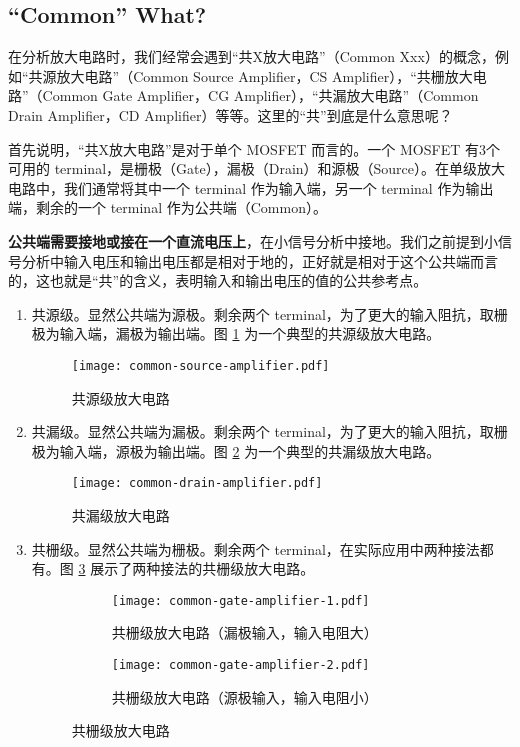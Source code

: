 \subsection{``Common'' What?}
在分析放大电路时，我们经常会遇到“共X放大电路”（Common Xxx）的概念，例如“共源放大电路”（Common Source Amplifier，CS Amplifier），“共栅放大电路”（Common Gate Amplifier，CG Amplifier），“共漏放大电路”（Common Drain Amplifier，CD Amplifier）等等。这里的“共”到底是什么意思呢？

首先说明，“共X放大电路”是对于单个 MOSFET 而言的。一个 MOSFET 有3个可用的 terminal，是栅极（Gate），漏极（Drain）和源极（Source）。在单级放大电路中，我们通常将其中一个 terminal 作为输入端，另一个 terminal 作为输出端，剩余的一个 terminal 作为公共端（Common）。

\textbf{公共端需要接地或接在一个直流电压上}，在小信号分析中接地。我们之前提到小信号分析中输入电压和输出电压都是相对于地的，正好就是相对于这个公共端而言的，这也就是“共”的含义，表明输入和输出电压的值的公共参考点。

\begin{enumerate}
    \item 共源级。显然公共端为源极。剩余两个 terminal，为了更大的输入阻抗，取栅极为输入端，漏极为输出端。图 \ref{fig:common-source-amplifier} 为一个典型的共源级放大电路。
            \begin{figure}[htp!]
                \centering
                \texttt{[image: common-source-amplifier.pdf]}
                \caption{共源级放大电路}
                \label{fig:common-source-amplifier}
            \end{figure}
    \item 共漏级。显然公共端为漏极。剩余两个 terminal，为了更大的输入阻抗，取栅极为输入端，源极为输出端。图 \ref{fig:common-drain-amplifier} 为一个典型的共漏级放大电路。
            \begin{figure}[htp!]
                \centering
                \texttt{[image: common-drain-amplifier.pdf]}
                \caption{共漏级放大电路}
                \label{fig:common-drain-amplifier}
            \end{figure}
    \item 共栅级。显然公共端为栅极。剩余两个 terminal，在实际应用中两种接法都有。图 \ref{fig:common-gate-amplifier} 展示了两种接法的共栅级放大电路。
            \begin{figure}[htp!]
                \centering
                \begin{subfigure}[b]{0.48\textwidth}
                    \centering
                    \texttt{[image: common-gate-amplifier-1.pdf]}
                    \caption{共栅级放大电路（漏极输入，输入电阻大）}
                \end{subfigure}
                \begin{subfigure}[b]{0.48\textwidth}
                    \centering
                    \texttt{[image: common-gate-amplifier-2.pdf]}
                    \caption{共栅级放大电路（源极输入，输入电阻小）}
                \end{subfigure}
                \caption{共栅级放大电路}
                \label{fig:common-gate-amplifier}
            \end{figure}
\end{enumerate}

